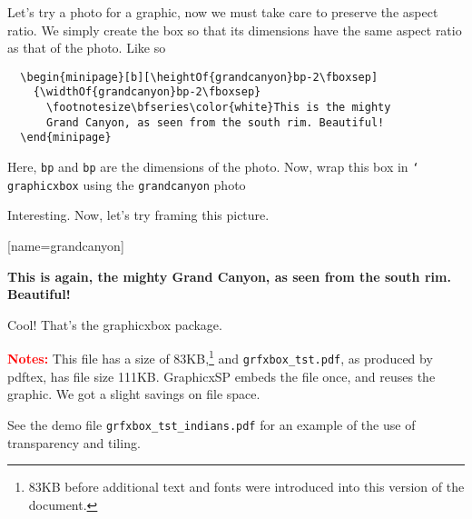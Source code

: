 \documentclass{article}
\newcommand{\cs}[1]{\texttt{\char`\\#1}}
\begin{document}
Let's try a photo for a graphic, now we must take care to preserve
the aspect ratio. We simply create the box so that its
dimensions have the same aspect ratio as that of the photo. Like so
{\small\begin{verbatim}
  \begin{minipage}[b][\heightOf{grandcanyon}bp-2\fboxsep]
    {\widthOf{grandcanyon}bp-2\fboxsep}
      \footnotesize\bfseries\color{white}This is the mighty
      Grand Canyon, as seen from the south rim. Beautiful!
  \end{minipage}
\end{verbatim}
}Here, \texttt{bp} and
\texttt{bp} are the dimensions of the photo.
Now, wrap this box in \cs{graphicxbox} using the \texttt{grandcanyon}
photo
\begin{center}
\end{center}

Interesting. Now, let's try framing this picture.

\begin{center}
\setlength{\fboxrule}{4bp}
[name=grandcanyon]{}{%
  \begin{minipage}[b][\heightOf{grandcanyon}bp-2\fboxsep-2\fboxrule]{\widthOf{grandcanyon}bp-2\fboxsep-2\fboxrule}
  \footnotesize\bfseries\color{white}This is again, the mighty Grand Canyon, as seen from the
  south rim.  Beautiful!
  \end{minipage}}
\end{center}
Cool! That's the \textsf{graphicxbox} package.

\textbf{\textcolor{red}{Notes:}} This file has a size of 83KB,\footnote{83KB before additional text and fonts were introduced
into this version of the document.} and \texttt{grfxbox\_tst.pdf},
as produced by \textsf{pdftex}, has file size 111KB. GraphicxSP embeds the file once, and reuses
the graphic. We got a slight savings on file space.

See the demo file \texttt{grfxbox\_tst\_indians.pdf} for an example of the use
of transparency and tiling.
\end{document}
